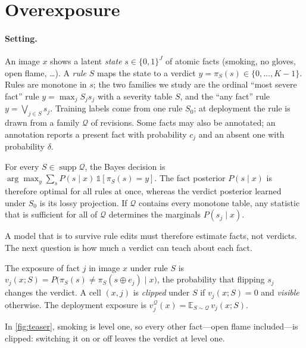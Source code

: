 \section{Overexposure}
\label{sec:theory}

\paragraph{Setting.} An image $x$ shows a latent \emph{state} $s\in\{0,1\}^J$ of atomic facts (smoking, no gloves, open flame, \dots). A \emph{rule} $S$ maps the state to a verdict $y=\pi_S(s)\in\{0,\dots,K-1\}$. Rules are monotone in $s$; the two families we study are the ordinal ``most severe fact'' rule $y=\max_j S_j s_j$ with a severity table $S$, and the ``any fact'' rule $y=\bigvee_{j\in S}s_j$. Training labels come from one rule $S_0$; at deployment the rule is drawn from a family $\mathcal Q$ of revisions. Some facts may also be annotated; an annotation reports a present fact with probability $c_j$ and an absent one with probability $\delta$.

\begin{theorem}\label{thm:suff}
For every $S\in\operatorname{supp}\mathcal Q$, the Bayes decision is $\arg\max_y\sum_s P(s\mid x)\,\mathbb 1[\pi_S(s)=y]$. The fact posterior $P(s\mid x)$ is therefore optimal for all rules at once, whereas the verdict posterior learned under $S_0$ is its lossy projection. If $\mathcal Q$ contains every monotone table, any statistic that is sufficient for all of $\mathcal Q$ determines the marginals $P(s_j\mid x)$.
\end{theorem}

\noindent A model that is to survive rule edits must therefore estimate facts, not verdicts. The next question is how much a verdict can teach about each fact.

\begin{definition}[Exposure]
The exposure of fact $j$ in image $x$ under rule $S$ is $v_j(x;S)=P\big(\pi_S(s)\neq\pi_S(s\oplus e_j)\mid x\big)$, the probability that flipping $s_j$ changes the verdict. A cell $(x,j)$ is \emph{clipped} under $S$ if $v_j(x;S)=0$ and \emph{visible} otherwise. The deployment exposure is $v^{\mathcal Q}_j(x)=\mathbb E_{S\sim\mathcal Q}\,v_j(x;S)$.
\end{definition}

\noindent In \cref{fig:teaser}, smoking is level one, so every other fact---open flame included---is clipped: switching it on or off leaves the verdict at level one.

